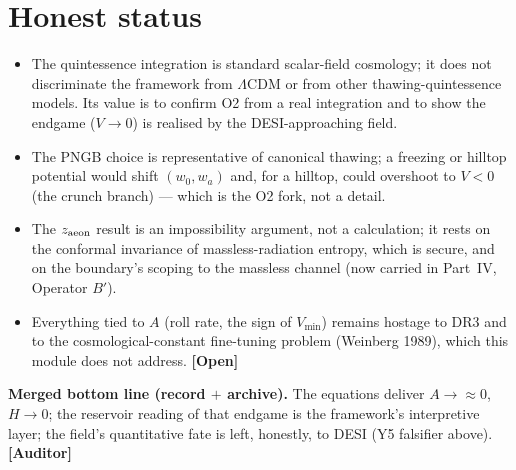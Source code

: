 \documentclass[11pt]{article}
\newcommand{\Open}{\textbf{\textcolor{gray!10!black}{[Open]}}}
\newcommand{\Auditor}{\textbf{\textcolor{teal!55!black}{[Auditor]}}}
\begin{document}
\section{Honest status}
\begin{itemize}[leftmargin=1.3em,itemsep=2pt]
\item The quintessence integration is standard scalar-field cosmology; it does not discriminate the framework from $\Lambda$CDM or from other thawing-quintessence models. Its value is to confirm O2 from a real integration and to show the endgame ($V\!\to\!0$) is realised by the DESI-approaching field.
\item The PNGB choice is representative of canonical thawing; a freezing or hilltop potential would shift $(w_0,w_a)$ and, for a hilltop, could overshoot to $V<0$ (the crunch branch) --- which is the O2 fork, not a detail.
\item The $z_{\rm aeon}$ result is an impossibility argument, not a calculation; it rests on the conformal invariance of massless-radiation entropy, which is secure, and on the boundary's scoping to the massless channel (now carried in Part~IV, Operator $B'$).
\item Everything tied to $A$ (roll rate, the sign of $V_{\min}$) remains hostage to DR3 and to the cosmological-constant fine-tuning problem (Weinberg 1989), which this module does not address. \Open
\end{itemize}


\textbf{Merged bottom line (record $+$ archive).} The equations deliver $A\to\approx0$, $H\to0$; the reservoir reading of that endgame is the framework's interpretive layer; the field's quantitative fate is left, honestly, to DESI (Y5 falsifier above). \Auditor

\end{document}
